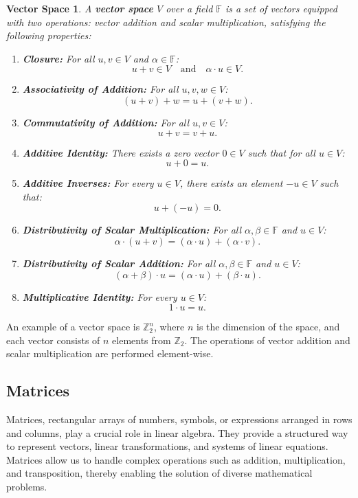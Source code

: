 \newtheorem*{vsp}{Vector Space}
\begin{vsp}
A \textbf{vector space} $V$ over a field $\mathbb{F}$ is a set of vectors equipped with two operations: vector addition and scalar multiplication, satisfying the following properties:

\begin{enumerate}
    \item \textbf{Closure:} For all $u, v \in V$ and $\alpha \in \mathbb{F}$:
    \[
    u + v \in V \quad \text{and} \quad \alpha \cdot u \in V.
    \]

    \item \textbf{Associativity of Addition:} For all $u, v, w \in V$:
    \[
    (u + v) + w = u + (v + w).
    \]

    \item \textbf{Commutativity of Addition:} For all $u, v \in V$:
    \[
    u + v = v + u.
    \]

    \item \textbf{Additive Identity:} There exists a zero vector $0 \in V$ such that for all $u \in V$:
    \[
    u + 0 = u.
    \]

    \item \textbf{Additive Inverses:} For every $u \in V$, there exists an element $-u \in V$ such that:
    \[
    u + (-u) = 0.
    \]

    \item \textbf{Distributivity of Scalar Multiplication:} For all $\alpha, \beta \in \mathbb{F}$ and $u \in V$:
    \[
    \alpha \cdot (u + v) = (\alpha \cdot u) + (\alpha \cdot v).
    \]

    \item \textbf{Distributivity of Scalar Addition:} For all $\alpha, \beta \in \mathbb{F}$ and $u \in V$:
    \[
    (\alpha + \beta) \cdot u = (\alpha \cdot u) + (\beta \cdot u).
    \]

    \item \textbf{Multiplicative Identity:} For every $u \in V$:
    \[
    1 \cdot u = u.
    \]
\end{enumerate}
\end{vsp}

An example of a vector space is $\mathbb{Z}_2^n$, where $n$ is the dimension of the space, and each vector consists of $n$ elements from $\mathbb{Z}_2$. The operations of vector addition and scalar multiplication are performed element-wise.

\subsection{Matrices}
Matrices, rectangular arrays of numbers, symbols, or expressions arranged in rows and columns, play a crucial role in linear algebra. They provide a structured way to represent vectors, linear transformations, and systems of linear equations. Matrices allow us to handle complex operations such as addition, multiplication, and transposition, thereby enabling the solution of diverse mathematical problems.

